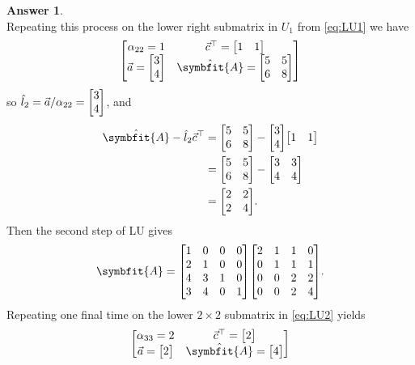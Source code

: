 \documentclass{article}
\theoremstyle{definition}
\newtheorem*{answer}{Answer}
\newcommand{\mat}[1]{\symbfit{#1}}
\begin{document}
\begin{enumerate}[leftmargin=\labelsep]
\begin{enumerate}
\begin{answer}
\begin{equation}
			            \end{equation}
			            Repeating this process on the lower right submatrix in $U_1$ from \cref{eq:LU1} we have
			            \begin{align*}
				            \begin{bmatrix}
					            \alpha_{22}=1 & \vec{c}^{\top} = \mqty[1 & 1] \\
					            \displaystyle \vec{a} = \mqty[3               \\4] & \hat{\mat{A}} = \mqty[5&5\\6&8]
				            \end{bmatrix}
			            \end{align*}
			            so \(\hat{l}_2 = \vec{a}/\alpha_{22} = \mqty[3\\4]\), and
			            \begin{align*}
				            \hat{\mat{A}}-\hat{l}_2 \vec{c}^{\top} & = \mqty[5 & 5 \\6&8]-\mqty[3\\4]\mqty[1&1] \\
				                                                   & = \mqty[5 & 5 \\6&8]-\mqty[3&3\\4&4] \\
				                                                   & = \mqty[2 & 2 \\2&4].
			            \end{align*}
			            Then the second step of LU gives
			            \begin{equation}
				            \mat{A} = \mqty[1&0&0&0\\2&1&0&0\\4&3&1&0\\3&4&0&1] \mqty[2&1&1&0\\0&1&1&1\\0&0&2&2\\0&0&2&4] \label{eq:LU2}.
			            \end{equation}
			            Repeating one final time on the lower \(2\times2\) submatrix in \cref{eq:LU2} yields
			            \begin{align*}
				            \begin{bmatrix}
					            \alpha_{33}=2                    & \vec{c}^{\top} = \mqty[2] \\
					            \displaystyle \vec{a} = \mqty[2] & \hat{\mat{A}} = \mqty[4]
				            \end{bmatrix}

\end{align*}
\end{answer}
\end{enumerate}
\end{enumerate}
\end{document}
